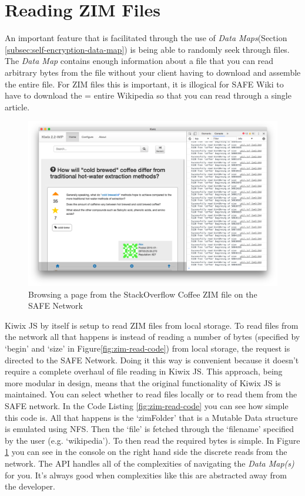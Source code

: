 \section{Reading ZIM Files}
 
An important feature that is facilitated through the use of \textit{Data Maps}(Section \ref{subsec:self-encryption-data-map}) is being able to randomly seek through files. The \textit{Data Map} contains enough information about a file that you can read arbitrary bytes from the file without your client having to download and assemble the entire file. For ZIM files this is important, it is illogical for SAFE Wiki to have to download the = entire Wikipedia so that you can read through a single article. 

\begin{figure}
	\begin{center}
		\includegraphics[width=\textwidth]{images/safe-wiki-browsing-coffee}
		\caption{Browsing a page from the StackOverflow Coffee ZIM file on the SAFE Network}
		\label{fig:browsing-coffee}
	\end{center}
\end{figure}

Kiwix JS by itself is setup to read ZIM files from local storage. To read files from the network all that happens is instead of reading a number of bytes (specified by `begin' and `size' in Figure\ref{fig:zim-read-code}) from local storage, the request is directed to the SAFE Network. Doing it this way is convenient because it doesn't require a complete overhaul of file reading in Kiwix JS. This approach, being more modular in design, means that the original functionality of Kiwix JS is maintained. You can select whether to read files locally or to read them from the SAFE network. In the Code Listing \ref{fig:zim-read-code} you can see how simple this code is. All that happens is the `zimFolder' that is a Mutable Data structure is emulated using NFS. Then the `file' is fetched through the `filename' specified by the user (e.g. `wikipedia'). To then read the required bytes is simple. In Figure \ref{fig:browsing-coffee} you can see in the console on the right hand side the discrete reads from the network. The API handles all of the complexities of navigating the \textit{Data Map(s)} for you. It's always good when complexities like this are abstracted away from the developer.

